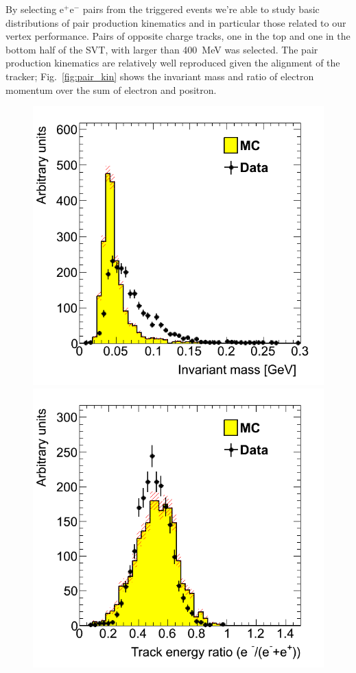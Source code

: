 By selecting e$^{+}$e$^{-}$ pairs from the triggered events we're able to study basic distributions of pair production kinematics and in particular those related to our vertex performance. Pairs of opposite charge tracks, one in the top and one in the bottom half of the SVT, with larger than 400~MeV was selected. The pair production kinematics are relatively well reproduced given the alignment of the tracker; Fig.~\ref{fig:pair_kin} shows the invariant mass and ratio of electron momentum over the sum of electron and positron. 
\begin{figure}[ht]
   \includegraphics[scale=0.25]{test2012/vertexing/figures/h_invM_h_invM_dataMC_0016x0_twotrksel.png}
   \includegraphics[scale=0.25]{test2012/vertexing/figures/h_ratioEsum_h_ratioEsum_dataMC_0016x0_twotrksel.png}

\end{figure}
